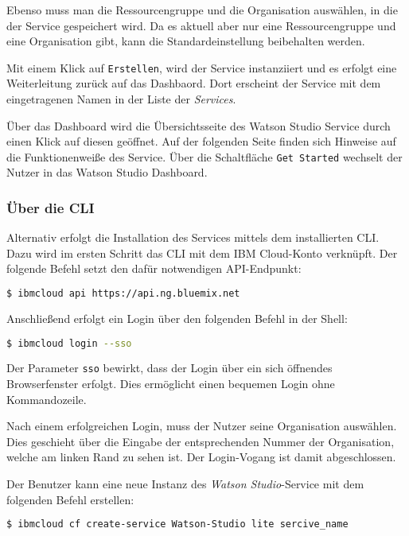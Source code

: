 Ebenso muss man die Ressourcengruppe und die Organisation auswählen, in die der Service gespeichert wird. Da es aktuell
aber nur eine Ressourcengruppe und eine Organisation gibt, kann die Standardeinstellung beibehalten werden.

Mit einem Klick auf \texttt{Erstellen}, wird der Service instanziiert und es erfolgt eine Weiterleitung zurück auf das
Dashbaord. Dort erscheint der Service mit dem eingetragenen Namen in der Liste der \textit{Services}.

Über das Dashboard wird die Übersichtsseite des Watson Studio Service durch einen Klick auf diesen geöffnet. Auf der
folgenden Seite finden sich Hinweise auf die Funktionenweiße des Service. Über die Schaltfläche \texttt{Get Started}
wechselt der Nutzer in das Watson Studio Dashboard.

\subsubsection*{Über die CLI}
Alternativ erfolgt die Installation des Services mittels dem installierten CLI. Dazu wird im ersten Schritt das CLI mit
dem IBM Cloud-Konto verknüpft. Der folgende Befehl setzt den dafür notwendigen API-Endpunkt:

\begin{lstlisting}[language=bash, caption=Setzen des API-Endpunkt, label=Setzen des API Targets]
    $ ibmcloud api https://api.ng.bluemix.net
\end{lstlisting}

Anschließend erfolgt ein Login über den folgenden Befehl in der Shell:

\begin{lstlisting}[language=bash, caption=Login über CLI und Single Sign-on, label=Login über CLI und SSO]
    $ ibmcloud login --sso
\end{lstlisting}

Der Parameter \texttt{sso} bewirkt, dass der Login über ein sich öffnendes Browserfenster erfolgt. Dies ermöglicht einen
bequemen Login ohne Kommandozeile.

Nach einem erfolgreichen Login, muss der Nutzer seine Organisation auswählen. Dies geschieht über die Eingabe der
entsprechenden Nummer der Organisation, welche am linken Rand zu sehen ist. Der Login-Vogang ist damit abgeschlossen.

Der Benutzer kann eine neue Instanz des \textit{Watson Studio}-Service mit dem folgenden Befehl erstellen:

\begin{lstlisting}[language=bash, caption=Instanziierung des Watson Studio Services, label=Instanziierung des Watson Studio Services]
    $ ibmcloud cf create-service Watson-Studio lite sercive_name
\end{lstlisting}

